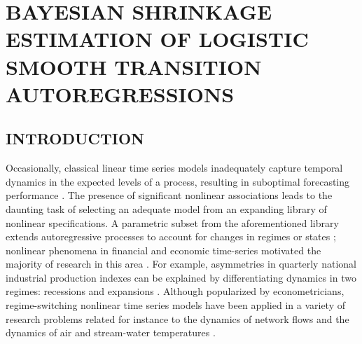 \chapter{BAYESIAN SHRINKAGE ESTIMATION OF LOGISTIC SMOOTH TRANSITION AUTOREGRESSIONS}
\label{chap:temp}

\section{INTRODUCTION}
Occasionally, classical linear time series models inadequately capture temporal dynamics in the expected levels of a process, resulting in suboptimal forecasting performance \citep{Lee1993}. The presence of significant nonlinear associations leads to the daunting task of selecting an adequate model from an expanding library of nonlinear specifications. A parametric subset from the aforementioned library extends autoregressive processes to account for changes in regimes or states \citep{Priestley1988}; nonlinear phenomena in financial and economic time-series motivated the majority of research in this area \citep{Terasvirta2010,Zivot2006,Franses2000}. For example, asymmetries in quarterly national industrial production indexes can be explained by differentiating dynamics in two regimes: recessions and expansions \citep{Terasvirta1992}. Although popularized by econometricians, regime-switching nonlinear time series models have been applied in a variety of research problems related for instance to the dynamics of network flows \citep{Kamarianakis2010} and the dynamics of air \citep{Battaglia2012} and stream-water temperatures \citep{Kamarianakis2016}. 

